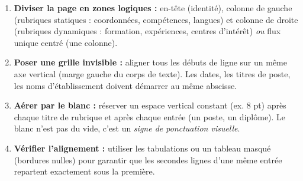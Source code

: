 \documentclass[11pt]{article}
\begin{document}
\begin{methode}
\begin{enumerate}
    \item \textbf{Diviser la page en zones logiques :} en-tête (identité), colonne de gauche (rubriques statiques : coordonnées, compétences, langues) et colonne de droite (rubriques dynamiques : formation, expériences, centres d'intérêt) \emph{ou} flux unique centré (une colonne).
    \item \textbf{Poser une grille invisible :} aligner tous les débuts de ligne sur un même axe vertical (marge gauche du corps de texte). Les dates, les titres de poste, les noms d'établissement doivent démarrer au même abscisse.
    \item \textbf{Aérer par le blanc :} réserver un espace vertical constant (ex. 8 pt) après chaque titre de rubrique et après chaque entrée (un poste, un diplôme). Le blanc n'est pas du vide, c'est un \emph{signe de ponctuation visuelle}.
    \item \textbf{Vérifier l'alignement :} utiliser les tabulations ou un tableau masqué (bordures nulles) pour garantir que les secondes lignes d'une même entrée repartent exactement sous la première.
\end{enumerate}
\end{methode}
\end{document}
